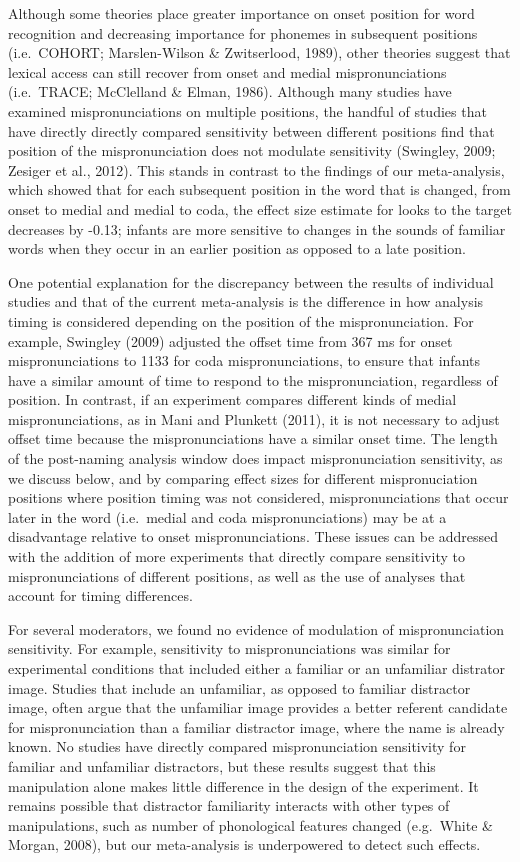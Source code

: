 \documentclass[man]{apa6}
\begin{document}
Although some theories place greater importance on onset position for word recognition and decreasing importance for phonemes in subsequent positions (i.e.~COHORT; Marslen-Wilson \& Zwitserlood, 1989), other theories suggest that lexical access can still recover from onset and medial mispronunciations (i.e.~TRACE; McClelland \& Elman, 1986). Although many studies have examined mispronunciations on multiple positions, the handful of studies that have directly directly compared sensitivity between different positions find that position of the mispronunciation does not modulate sensitivity (Swingley, 2009; Zesiger et al., 2012). This stands in contrast to the findings of our meta-analysis, which showed that for each subsequent position in the word that is changed, from onset to medial and medial to coda, the effect size estimate for looks to the target decreases by -0.13; infants are more sensitive to changes in the sounds of familiar words when they occur in an earlier position as opposed to a late position.

One potential explanation for the discrepancy between the results of individual studies and that of the current meta-analysis is the difference in how analysis timing is considered depending on the position of the mispronunciation. For example, Swingley (2009) adjusted the offset time from 367 ms for onset mispronunciations to 1133 for coda mispronunciations, to ensure that infants have a similar amount of time to respond to the mispronunciation, regardless of position. In contrast, if an experiment compares different kinds of medial mispronunciations, as in Mani and Plunkett (2011), it is not necessary to adjust offset time because the mispronunciations have a similar onset time. The length of the post-naming analysis window does impact mispronunciation sensitivity, as we discuss below, and by comparing effect sizes for different mispronuciation positions where position timing was not considered, mispronunciations that occur later in the word (i.e.~medial and coda mispronunciations) may be at a disadvantage relative to onset mispronunciations. These issues can be addressed with the addition of more experiments that directly compare sensitivity to mispronunciations of different positions, as well as the use of analyses that account for timing differences.

For several moderators, we found no evidence of modulation of mispronunciation sensitivity. For example, sensitivity to mispronunciations was similar for experimental conditions that included either a familiar or an unfamiliar distrator image. Studies that include an unfamiliar, as opposed to familiar distractor image, often argue that the unfamiliar image provides a better referent candidate for mispronunciation than a familiar distractor image, where the name is already known. No studies have directly compared mispronunciation sensitivity for familiar and unfamiliar distractors, but these results suggest that this manipulation alone makes little difference in the design of the experiment. It remains possible that distractor familiarity interacts with other types of manipulations, such as number of phonological features changed (e.g.~White \& Morgan, 2008), but our meta-analysis is underpowered to detect such effects.
\end{document}
